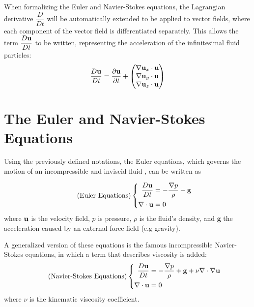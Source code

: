 When formalizing the Euler and Navier-Stokes equations, the Lagrangian derivative $\dfrac{D}{Dt}$ will be automatically extended to be applied to vector fields, where each component of the vector field is differentiated separately. This allows the term $\dfrac{D\textbf{u}}{Dt}$ to be written, representing the acceleration of the infinitesimal fluid particles:
\begin{equation}
    \label{Du/Dt}
    \frac{D\textbf{u}}{Dt} = \frac{\partial\textbf{u}}{\partial t}
    + \begin{pmatrix}
       \nabla \textbf{u}_x  \cdot \textbf{u}\\
        \nabla \textbf{u}_y \cdot \textbf{u}\\
        \nabla \textbf{u}_z \cdot \textbf{u}
     \end{pmatrix}
\end{equation}








\section{The Euler and Navier-Stokes Equations}
\label{Euler N-S Eqns}

Using the previously defined notations, the Euler equations, which governs the motion of an incompressible and inviscid fluid
, can be written as

\begin{equation}
    \tag{Euler Equations}
    \left \{
    \begin{aligned}
         \frac{D\textbf{u}}{Dt}   &=   -\frac{\nabla p}{\rho} + \textbf{g} \\
         \nabla \cdot \textbf{u}   &=   0
    \end{aligned} \right.
    \label{eqn:Euler Equations}
\end{equation} 
where $\textbf{u}$ is the velocity field, $p$ is pressure, $\rho$ is the fluid's density, and $\textbf{g}$ the acceleration caused by an external force field (e.g gravity).

A generalized version of these equations is the famous incompressible Navier-Stokes equations, in which a term that describes viscosity is added:
\begin{equation}
    \tag{Navier-Stokes Equations}
    \left \{
    \begin{aligned}
         \frac{D\textbf{u}}{Dt}   &=   -\frac{\nabla p}{\rho} + \textbf{g} + \nu \nabla \cdot \nabla \textbf{u} \\
         \nabla \cdot \textbf{u}  &=   0
    \end{aligned} \right.
    \label{eqn:Navier-Stokes Equations}
\end{equation} 
where $\nu$ is the kinematic viscosity coefficient.


